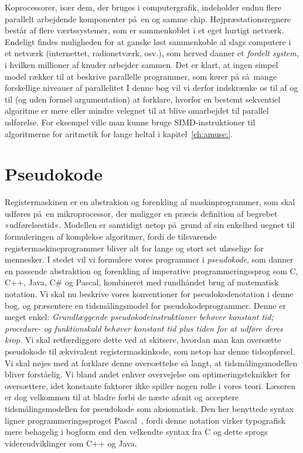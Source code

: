 Koprocessorer, 
især dem, der bruges i computergrafik,
indeholder endnu flere parallelt arbejdende komponenter på en og samme chip.
Højpræstationsregnere
består af flere værtssystemer, som er sammenkoblet i et eget hurtigt netværk.
Endeligt findes muligheden for at ganske løst sammenkoble al slags computere i et netværk (internettet, radionetværk, osv.), som herved danner et \emph{fordelt system}, 
i hvilken millioner af knuder arbejder sammen.
Det er klart, at ingen simpel model rækker til at beskrive parallelle programmer, som kører på så mange forskellige niveauer af parallelitet
I denne bog vil vi derfor indskrænke os til af og til (og uden formel argumentation) at forklare, hvorfor en bestemt sekventiel algoritme er mere eller mindre velegnet til at blive omarbejdet til parallel udførelse.
For eksempel ville man kunne bruge SIMD-instruktioner til algoritmerne for aritmetik for lange heltal
 i kapitel~\ref{ch:amuse:}.
\section{Pseudokode}


Registermaskinen er en abstrakion og forenkling af maskinprogrammer, som skal udføres på en mikroprocessor, der muliggør en præcis definition af begrebet »udførelsestid«.
Modellen er samtidigt netop på grund af sin enkelhed uegnet til formuleringen af komplekse algoritmer, fordi de tilsvarende registermaskineprogrammer bliver alt for lange og stort set ulæselige for mennesker.
I stedet vil vi formulere vores programmer i \emph{pseudokode}, som danner en passende abstraktion og forenkling af imperative programmeringssprog som C, C++, Java, C\# og Pascal,
kombineret med rundhåndet brug af matematisk notation.
Vi skal nu beskrive vores konventioner for pseudokodenotation i denne bog, og præsentere en tidsmålingsmodel for pseudokodeprogrammer.
Denne er meget enkel: 
\emph{Grundlæggende pseudokodeinstruktioner behøver konstant tid; procedure- og funktionskald behøver konstant tid plus tiden for at udføre deres krop.}
Vi skal retfærdiggøre dette ved at skitsere, hvordan man kan oversætte pseudokode til ækvivalent registermaskinkode, som netop har denne tidsopførsel.
Vi skal nøjes med at forklare denne oversættelse så langt, at tidsmålingsmodellen bliver forståelig.
Vi bland andet enhver overvejelse om optimeringsteknikker for oversættere,
idet konstante faktorer ikke spiller nogen rolle i vores teori.
Læseren er dog velkommen til at bladre forbi de næste afsnit og acceptere tidsmålingsmodellen for pseudokode som aksiomatisk.
Den her benyttede syntax ligner programmeringssproget Pascal~\cite{JenWir91}, fordi denne notation virker typografisk mere behagelig i bogform end den velkendte syntax fra C og dette sprogs videreudviklinger som C++ og Java.

